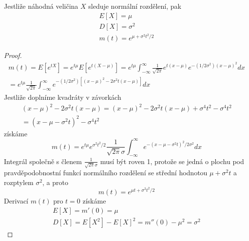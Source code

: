 \begin{theorem}
Jestliže náhodná veličina $X$ sleduje normální rozdělení, pak
\begin{gather*}
E[X] = \mu\\
D[X] = \sigma^2\\
m(t) = e^{\mu + \sigma^2 t^2 / 2}
\end{gather*}
\end{theorem}
\begin{proof}
\begin{gather*}
m(t) = E[e^{tX}] = e^{t \mu}E[e^{t(X-\mu)}] = e^{t \mu} \int_{-\infty}^{\infty} \frac{1}{\sqrt{2 \pi}} e^{t(x-\mu)}e^{-(1/2\sigma^2)(x-\mu)^2}dx\\
= e^{t\mu} \frac{1}{\sqrt{2 \pi}} \int_{-\infty}^{\infty} e^{-(1/2 \sigma^2)[(x - \mu)^2 - 2 \sigma^2 t(x - \mu)]}dx
\end{gather*}
Jestliže doplníme kvadráty v závorkách
\begin{gather*}
(x - \mu)^2 - 2 \sigma^2 t(x - \mu) = (x - \mu)^2 - 2 \sigma^2 t(x - \mu) + \sigma^4 t^2 - \sigma^4 t^2\\
=(x - \mu - \sigma^2 t)^2 - \sigma^4 t^2
\end{gather*}
získáme
\begin{equation*}
m(t) = e^{t \mu} e^{\sigma^2 t^2 / 2} \frac{1}{\sqrt{2 \pi} \sigma} \int_{-\infty}^{\infty} e^{-(x - \mu - \sigma^2 t)^2 / 2 \sigma^2}dx
\end{equation*}
Integrál společně s členem $\frac{1}{\sqrt{2 \pi} \sigma}$ musí být roven 1, protože se jedná o plochu pod pravděpodobnostní funkcí normálního rozdělení se střední hodnotou $\mu + \sigma^2 t$ a rozptylem $\sigma^2$, a proto
\begin{equation*}
m(t) = e^{\mu t + \sigma^2 t^2 / 2}
\end{equation*}
Derivací $m(t)$ pro $t = 0$ získáme
\begin{gather*}
E[X] = m'(0) = \mu\\
D[X] = E[X^2] - E[X]^2 = m''(0) - \mu^2 = \sigma^2
\end{gather*}
\end{proof}

